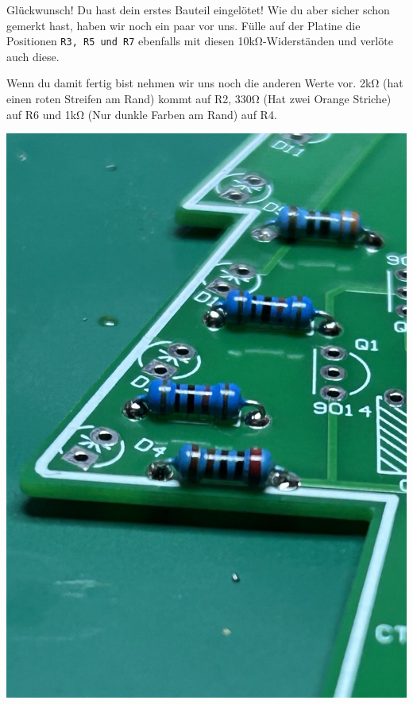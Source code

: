 \documentclass[10pt]{article}
\begin{document}
	\begin{minipage}{0.85\textwidth}
		Glückwunsch! Du hast dein erstes Bauteil eingelötet! Wie du aber sicher schon gemerkt hast, haben wir noch ein paar vor uns. Fülle auf der Platine die Positionen \verb|R3, R5 und R7| ebenfalls mit diesen 10kΩ-Widerständen und verlöte auch diese.
	
		Wenn du damit fertig bist nehmen wir uns noch die anderen Werte vor. 2kΩ (hat einen roten Streifen am Rand) kommt auf R2, 330Ω (Hat zwei Orange Striche) auf R6 und 1kΩ (Nur dunkle Farben am Rand) auf R4.
	\end{minipage}
	\begin{minipage}{0.15\textwidth}\raggedright
	\includegraphics[width=\linewidth, right]{resistor-place.png}
	\end{minipage}
	
	\pagebreak
	
\end{document}
